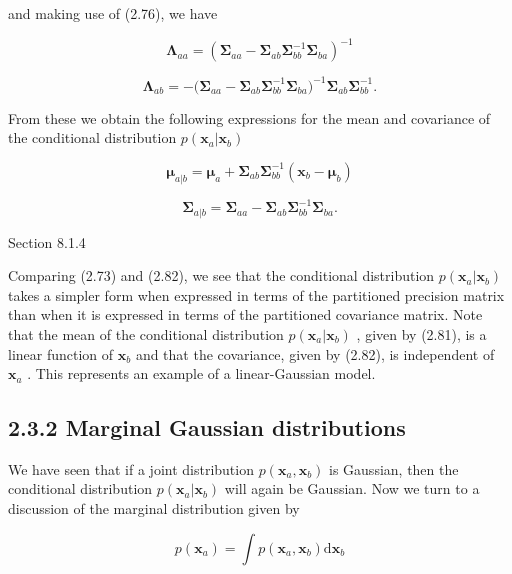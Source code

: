 \documentclass[
  10
]{article}
\begin{document}
and making use of (2.76), we have

\[
{\boldsymbol {\Lambda} _ {a a}} = {\left(\boldsymbol {\Sigma} _ {a a} - \boldsymbol {\Sigma} _ {a b} \boldsymbol {\Sigma} _ {b b} ^ {- 1} \boldsymbol {\Sigma} _ {b a}\right) ^ {- 1}}\tag{2.79}
\]

\[
{\boldsymbol {\Lambda} _ {a b}} = {- \big (\boldsymbol {\Sigma} _ {a a} - \boldsymbol {\Sigma} _ {a b} \boldsymbol {\Sigma} _ {b b} ^ {- 1} \boldsymbol {\Sigma} _ {b a} \big) ^ {- 1} \boldsymbol {\Sigma} _ {a b} \boldsymbol {\Sigma} _ {b b} ^ {- 1}.}\tag{2.80}
\]

From these we obtain the following expressions for the mean and
covariance of the conditional distribution
\(p ( \mathbf { x } _ { a } | \mathbf { x } _ { b } )\)

\[
{\pmb {\mu} _ {a | b}} = {\pmb {\mu} _ {a} + \pmb {\Sigma} _ {a b} \pmb {\Sigma} _ {b b} ^ {- 1} (\mathbf {x} _ {b} - \pmb {\mu} _ {b})}\tag{2.81}
\]

\[
{\pmb \Sigma_ {a | b}} = {\pmb \Sigma_ {a a} - \pmb \Sigma_ {a b} \pmb \Sigma_ {b b} ^ {- 1} \pmb \Sigma_ {b a}.}\tag{2.82}
\]

Section 8.1.4

Comparing (2.73) and (2.82), we see that the conditional distribution
\(p ( \mathbf { x } _ { a } | \mathbf { x } _ { b } )\) takes a simpler
form when expressed in terms of the partitioned precision matrix than
when it is expressed in terms of the partitioned covariance matrix. Note
that the mean of the conditional distribution
\(p ( \mathbf { x } _ { a } | \mathbf { x } _ { b } )\) , given by
(2.81), is a linear function of \(\mathbf { x } _ { b }\) and that the
covariance, given by (2.82), is independent of \(\mathbf { x } _ { a }\)
. This represents an example of a linear-Gaussian model.

\subsection{2.3.2 Marginal Gaussian
distributions}\label{marginal-gaussian-distributions}

We have seen that if a joint distribution
\(p ( \mathbf { x } _ { a } , \mathbf { x } _ { b } )\) is Gaussian,
then the conditional distribution
\(p ( \mathbf { x } _ { a } | \mathbf { x } _ { b } )\) will again be
Gaussian. Now we turn to a discussion of the marginal distribution given
by

\[
p (\mathbf {x} _ {a}) = \int p (\mathbf {x} _ {a}, \mathbf {x} _ {b}) \mathrm{d} \mathbf {x} _ {b}\tag{2.83}
\]
\end{document}
